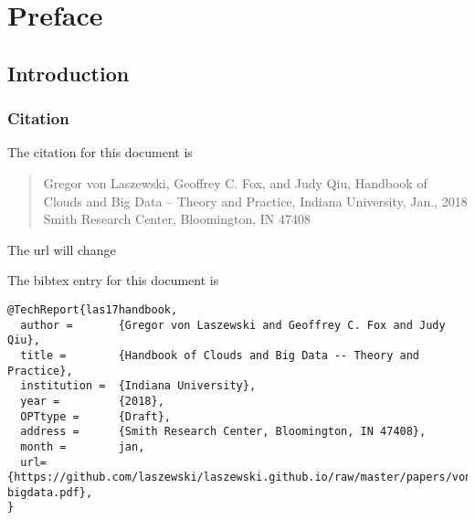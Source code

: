 
\part{Preface}




\chapter{Introduction}


\section{Citation}

The citation for this document is 

\begin{quote}

Gregor von Laszewski, Geoffrey C. Fox, and Judy Qiu, Handbook of
Clouds and Big Data -- Theory and Practice, Indiana University,
Jan., 2018
Smith Research Center, Bloomington, IN 47408
\end{quote}

\begin{WARNING}
The url will change
\end{WARNING}

The bibtex entry for this document is

\begin{verbatim}
@TechReport{las17handbook,
  author =       {Gregor von Laszewski and Geoffrey C. Fox and Judy Qiu},
  title =        {Handbook of Clouds and Big Data -- Theory and Practice},
  institution =  {Indiana University},
  year =         {2018},
  OPTtype =      {Draft},
  address =      {Smith Research Center, Bloomington, IN 47408},
  month =        jan,
  url={https://github.com/laszewski/laszewski.github.io/raw/master/papers/vonLaszewski-bigdata.pdf},
}
\end{verbatim}



